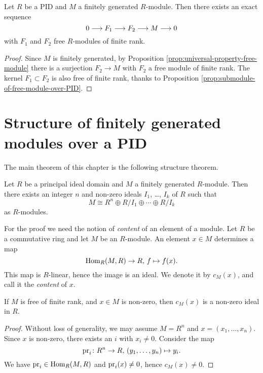 \begin{corollary}\label{cor:free-presentation}
Let $R$ be a PID and $M$ a finitely generated $R$-module. Then there exists an exact sequence 
\[
	0 \longrightarrow F_1 \longrightarrow F_2 \longrightarrow M \longrightarrow 0
\]
with $F_1$ and $F_2$ free $R$-modules of finite rank.
\end{corollary}

\begin{proof}
Since $M$ is finitely generated, by Proposition \ref{prop:universal-property-free-module} there is a surjection $F_2 \to M$ with $F_2$ a free module of finite rank. The kernel $F_1\subset F_2$ is also free of finite rank, thanks to Proposition \ref{prop:submodule-of-free-module-over-PID}.
\end{proof}


\section{Structure of finitely generated modules over a PID}

The main theorem of this chapter is the following structure theorem.

\begin{theorem}\label{thm:structure-fg-mod-over-PID}
Let $R$ be a principal ideal domain and $M$  a finitely generated $R$-module. Then there exists an integer $n$ and non-zero ideals $I_1$,  \ldots,  $I_k$ of $R$ such that
\[
	M \cong R^n \oplus R/I_1 \oplus \cdots \oplus R/I_k
\]
as $R$-modules.
\end{theorem}

For the proof we need the notion of \emph{content} of an element of a module.
Let $R$ be a commutative ring and let $M$ be an $R$-module. An element $x\in M$ determines a map
\begin{equation}\label{eq:content-evaluation}
	\operatorname{Hom}_R(M,R) \to R,\,f \mapsto f(x).
\end{equation}
This map is $R$-linear, hence the image is an ideal. We denote it by $c_M(x)$, and call it the \emph{content} of $x$.

\begin{lemma}\label{lemma:non-zero-content}
If $M$ is free of finite rank, and $x\in M$ is non-zero, then $c_M(x)$ is a non-zero ideal in $R$.
\end{lemma}

\begin{proof}
Without loss of generality, we may assume $M=R^n$ and $x=(x_1,\ldots, x_n)$. Since $x$ is non-zero, there exists an $i$ with $x_i\neq 0$. Consider the map
\[
	\operatorname{pr}_i \colon R^n \to R,\, (y_1,\ldots, y_n) \mapsto y_i.
\]
We have $\operatorname{pr}_i\in \operatorname{Hom}_R(M,R)$ and $\operatorname{pr}_i(x)\neq 0$, hence $c_M(x)\neq 0$.
\end{proof}

